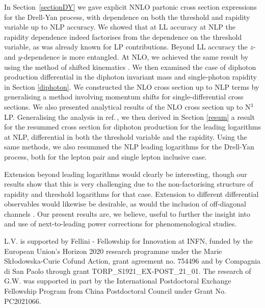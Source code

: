 \documentclass[11pt]{article}
\newcommand\refr[1]      {ref.\,\cite{#1}}
\begin{document}
In Section~\ref{sectionDY} we gave explicit NNLO partonic cross section expressions for the Drell-Yan process, with dependence on both the threshold and rapidity variable up to NLP accuracy. We showed that at LL accuracy at NLP the rapidity dependence indeed factorises from the dependence on the threshold variable, as was already known for LP contributions.  Beyond LL accuracy the $z$- and $y$-dependence is more entangled. At NLO, we achieved the same result by using the method of shifted kinematics \cite{DelDuca:2017twk}. 
We then examined the case of diphoton production differential in the diphoton invariant mass and single-photon rapidity in Section \ref{diphoton}. We constructed the NLO cross section up to NLP terms by generalising a method involving momentum shifts for single-differential cross sections. 
We also presented analytical results of the NLO cross section up to N$^3$LP.
Generalising the analysis in \refr{Bahjat-Abbas:2019fqa}, we then derived in Section \ref{resum} a result for the resummed cross section for diphoton production for the leading logarithms at NLP, differential in both the threshold variable and the rapidity. Using the same methods, we also resummed the NLP leading logarithms for the Drell-Yan process, both for the lepton pair and single lepton inclusive case. 

Extension beyond leading logarithms would clearly be interesting, though our results show that this is very challenging due to the non-factorising structure of rapidity and threshold logarithms for that case. Extension to different differential observables would likewise be desirable, as would the inclusion of
off-diagonal channels \cite{Beneke:2020ibj,vanBeekveld:2021mxn}. Our present results are, we believe, useful to further the insight into and use of next-to-leading power corrections for phenomenological studies.

\acknowledgments


L.V. is supported by Fellini - Fellowship for Innovation 
at INFN, funded by the European Union's Horizon 2020 
research programme under the Marie Sk\l{}odowska-Curie 
Cofund Action, grant agreement no. 754496 and by 
Compagnia di San Paolo through grant 
TORP\_S1921\_EX-POST\_21\_01. The research of G.W. was supported in part by the International Postdoctoral Exchange Fellowship Program from China Postdoctoral Council under Grant No. PC2021066.

\appendix
\end{document}
